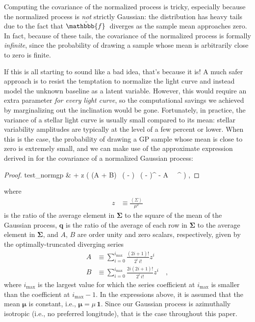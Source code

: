 \documentclass[modern]{aastex62}
\begin{document}
Computing the covariance of the normalized process is tricky, especially
because the normalized process is \emph{not} strictly Gaussian: the distribution
has heavy tails due to the fact that $\tilde{\mathbbb{f}\hspace{0.2em}}$ diverges as
the sample mean approaches zero. In fact, because of these tails, the covariance
of the normalized process is formally \emph{infinite}, since the probability of
drawing a sample whose mean is arbitrarily close to zero is finite.

If this is all starting to sound like a bad idea, that's because it is!
A much safer approach is to resist the temptation to normalize the light curve
and instead model the unknown baseline as a latent variable. However,
this would require an extra parameter \emph{for every light curve}, so the
computational savings we achieved by marginalizing out the inclination
would be gone. Fortunately, in practice, the variance of a stellar light curve
is usually small compared to its mean: stellar variability amplitudes are
typically at the level of a few percent or lower. When this is the case,
the probability of drawing a GP sample whose mean is close to zero is
extremely small, and we can make use of the approximate expression derived
in \citet{Luger2020} for the covariance of a normalized Gaussian process:
%
\begin{proof}{test_normgp}
    \label{eq:SigmaTilde}
    \tilde{\pmb{\Sigma}}
    & \approx
     \pmb{\Sigma} +
    z \Big(
    (A + B) \, ( - ) \, ( - )^\top
    - A \,  \, ^\top
    \Big)
    \quad,
\end{proof}
%
where
%
\begin{align}
    z & \equiv \frac{\left< \Sigma \right>}{\mu^2}
\end{align}
%
is the ratio of the average element in $\pmb{\Sigma}$
to the square of the mean of the Gaussian process,
$\mathbf{q}$ is the ratio of the average of each row in $\pmb{\Sigma}$
to the average element in $\pmb{\Sigma}$, and $A$, $B$ are
order unity and zero scalars, respectively,
given by the optimally-truncated diverging series
%
\begin{align}
    \label{eq:baseline_alpha}
    A
     & \equiv
    \sum\limits_{i=0}^{i_\mathrm{max}}
    \frac{(2i + 1)!}{2^i \, i!}
    z^i
    \\[1em]
    \label{eq:baseline_beta}
    B
     & \equiv
    \sum\limits_{i=0}^{i_\mathrm{max}}
    \frac{2i(2i + 1)!}{2^i \, i!}
    z^i
    \quad,
\end{align}
%
where $i_\mathrm{max}$ is the largest value for which the series coefficient at $i_\mathrm{max}$ is
smaller than the coefficient at $i_\mathrm{max} - 1$. In the expressions above, it is
assumed that the mean $\pmb{\mu}$ is constant, i.e., $\pmb{\mu} = \mu\, \mathbf{1}$.
Since our Gaussian process is azimuthally isotropic (i.e., no preferred
longitude), that is the case throughout this paper.
\end{document}
